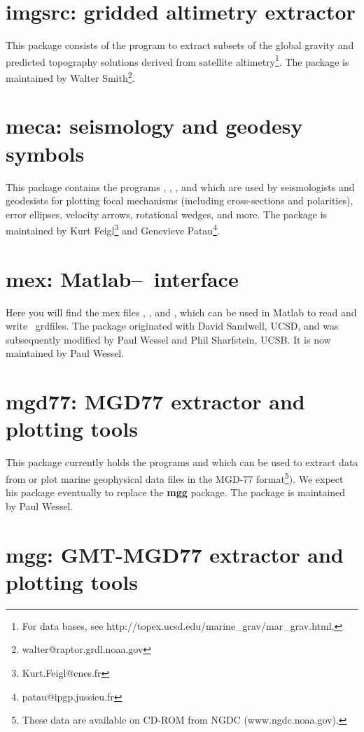 \section{imgsrc: gridded altimetry extractor}

This package consists of the program  to
extract subsets of the global gravity and predicted topography
solutions derived from satellite altimetry\footnote{For data bases,
see http://topex.ucsd.edu/marine\_grav/mar\_grav.html.}.  The package
is maintained by Walter Smith\footnote{walter@raptor.grdl.noaa.gov}.

\section{meca: seismology and geodesy symbols}

This package contains the programs , ,
, and  which are used
by seismologists and geodesists for plotting focal mechanisms (including
cross-sections and polarities), error ellipses, velocity arrows, rotational
wedges, and more.  The package is maintained by
Kurt Feigl\footnote{Kurt.Feigl@cnes.fr} and
Genevieve Patau\footnote{patau@ipgp.jussieu.fr}.

\section{mex: Matlab--\gmt\ interface}

Here you will find the mex files , ,
and , which can be used in Matlab to read and write
\GMT\ grdfiles.  The package originated with David Sandwell, UCSD,
and was subsequently modified by Paul Wessel and Phil Sharfstein, UCSB.
It is now maintained by Paul Wessel.

\section{mgd77: MGD77 extractor and plotting tools}

This package currently holds the programs  and
 which can be
used to extract data from or plot marine geophysical
data files in the MGD-77 format\footnote{These data are available on CD-ROM from NGDC
(www.ngdc.noaa.gov).}).  We expect his package eventually to replace the {\bf mgg} package.
The package is maintained by Paul Wessel.

\section{mgg: GMT-MGD77 extractor and plotting tools}

